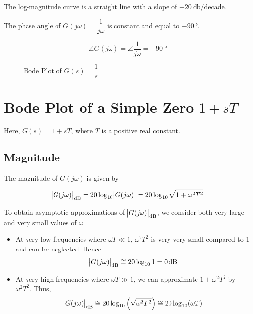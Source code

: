\documentclass[
  14pt,
  a4paper,
  oneside,
  open=any,
  a4paper,
  14pt]{report}
\begin{document}
The log-magnitude curve is a straight line with a slope of
\(\SI{-20}{\decibel}\)/decade.

The phase angle of \(G(j\omega) = \dfrac{1}{j\omega}\) is constant and
equal to \(\SI{-90}{\degree}\).

\[
    \angle G(j\omega) = \angle \dfrac{1}{j\omega} = \SI{-90}{\degree}
\]

\begin{figure}

\centering{



}

\caption{\label{fig-bode-plot-integrator}Bode Plot of
\(G(s) = \dfrac{1}{s}\)}

\end{figure}%

\newpage{}

\section{\texorpdfstring{Bode Plot of a Simple Zero
\(1+sT\)}{Bode Plot of a Simple Zero 1+sT}}\label{bode-plot-of-a-simple-zero-1st}

Here, \(G(s) = 1+sT\), where \(T\) is a positive real constant.

\subsection{Magnitude}\label{magnitude}

The magnitude of \(G(j\omega)\) is given by

\[
\abs{G(j\omega)}_{\unit{\decibel}} = 20\log_{10}\abs{G(j\omega)} = 20\log_{10}\sqrt{1+\omega^2 T^2}
\]

To obtain asymptotic approximations of
\(\abs{G(j\omega)}_{\unit{\decibel}}\), we consider both very large and
very small values of \(\omega\).

\begin{itemize}
\item
  At very low frequencies where \(\omega T \ll 1\), \(\omega^2 T^2\) is
  very very small compared to 1 and can be neglected. Hence \[
  \abs{G(j\omega)}_{\unit{\decibel}} \cong 20\log_{10} 1 = \SI{0}{\decibel}
  \]
\item
  At very high frequencies where \(\omega T \gg 1\), we can approximate
  \(1+\omega^2 T^2\) by \(\omega^2 T^2\). Thus, \[
  \abs{G(j\omega)}_{\unit{\decibel}} \cong 20\log_{10} \left(\sqrt{\omega^2 T^2} \right) \cong 20\log_{10}(\omega T)
  \]
\end{itemize}
\end{document}
